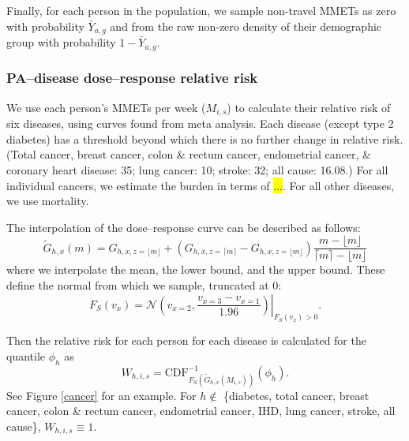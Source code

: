 \documentclass{article}
\begin{document}
Finally, for each person in the population, we sample non-travel MMETs as zero with probability $\bar{Y}_{a,g}$ and from the raw non-zero density of their demographic group with probability $1-\bar{Y}_{a,g}$.
 
\subsubsection{PA--disease dose--response relative risk}

We use each person's MMETs per week (${M}_{i,s}$) to calculate their relative risk of six diseases, using curves found from meta analysis. Each disease (except type 2 diabetes) has a threshold beyond which there is no further change in relative risk. (Total cancer, breast cancer, colon \& rectum cancer, endometrial cancer, \& coronary heart disease: 35; lung cancer: 10; stroke: 32; all cause: 16.08.) For all individual cancers, we estimate the burden in terms of \hl{...}. For all other diseases, we use mortality.

The interpolation of the dose--response curve can be described as follows:
$$\tilde{G}_{h,x}(m) = {G}_{h,x,z=\lfloor{m}\rfloor}+({G}_{h,x,z=\lceil{m}\rceil}-{G}_{h,x,z=\lfloor{m}\rfloor})\frac{m-\lfloor{m}\rfloor}{\lceil{m}\rceil-\lfloor{m}\rfloor}$$
where we interpolate the mean, the lower bound, and the upper bound. These define the normal from which we sample, truncated at 0:
$$F_S(v_x) = \mathcal{N}\left.\left(v_{x=2},\frac{v_{x=3}-v_{x=1}}{1.96}\right)\right|_{F_S(v_x)>0}. $$

Then the relative risk for each person for each disease is calculated for the quantile $\phi_h$ as
$$W_{h,i,s}=\text{CDF}_{F_S\left(\tilde{G}_{h,x}(M_{i,s})\right)}^{-1}\left(\phi_{h}\right).$$
See Figure \ref{cancer} for an example. For $h\not\in$ \{diabetes, total cancer, breast cancer, colon \& rectum cancer, endometrial cancer, IHD, lung cancer, stroke, all cause\}, $W_{h,i,s} \equiv 1$.
\end{document}
